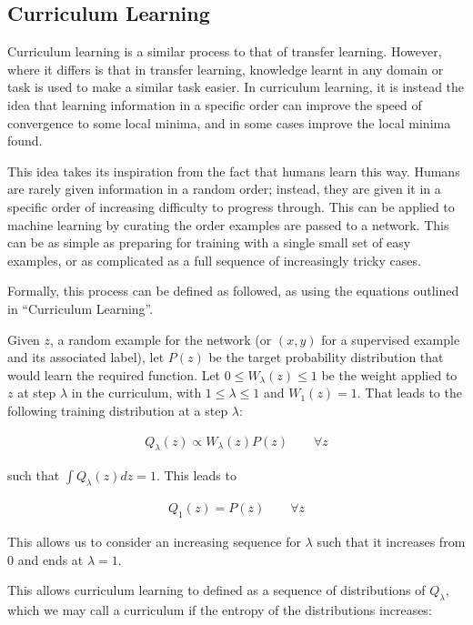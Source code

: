 \subsection{Curriculum Learning}

Curriculum learning is a similar process to that of transfer learning. However,
where it differs is that in transfer learning, knowledge learnt in any domain or
task is used to make a similar task easier. In curriculum learning, it is
instead the idea that learning information in a specific order can improve the
speed of convergence to some local minima, and in some cases improve the local
minima found.

This idea takes its inspiration from the fact that humans learn this way. Humans
are rarely given information in a random order; instead, they are given it in a
specific order of increasing difficulty to progress through. This can be applied
to machine learning by curating the order examples are passed to a network. This
can be as simple as preparing for training with a single small set of easy
examples, or as complicated as a full sequence of increasingly tricky cases.

Formally, this process can be defined as followed, as using the equations
outlined in ``Curriculum Learning''\cite{bengio2009curriculum}.

Given $z$, a random example for the network (or $(x, y)$ for a supervised
example and its associated label), let $P(z)$ be the target probability
distribution that would learn the required function. Let $0 \le W_{\lambda}(z)
\le 1$ be the weight applied to $z$ at step $\lambda$ in the curriculum, with
$1 \le \lambda \le 1$ and $W_1(z) = 1$. That leads to the following training
distribution at a step $\lambda$:

\begin{align}
    Q_{\lambda}(z) \propto W_{\lambda}(z) P(z) \qquad \forall z
\end{align}

such that $\int Q_{\lambda}(z) dz = 1$. This leads to

\begin{align}
    Q_1 (z) = P(z) \qquad \forall z
\end{align}

This allows us to consider an increasing sequence for $\lambda$ such that it
increases from 0 and ends at $\lambda = 1$.

This allows curriculum learning to defined as a sequence of distributions of
$Q_{\lambda}$, which we may call a curriculum if the entropy of the
distributions increases:

